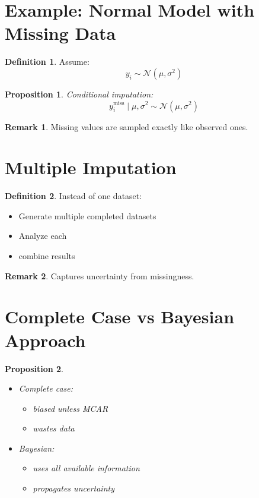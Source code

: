 \documentclass[12pt,oneside]{book}
\numberwithin{equation}{section}
\theoremstyle{definition}
\newtheorem{definition}{Definition}[section]
\newtheorem{remark}{Remark}[section]
\theoremstyle{plain}
\newtheorem{proposition}{Proposition}[section]
\theoremstyle{remark}
\newcommand{\Normal}{\mathcal{N}}
\begin{document}
\section{Example: Normal Model with Missing Data}

\begin{definition}
Assume:
$$
y_i \sim \Normal(\mu, \sigma^2)
$$
\end{definition}

\begin{proposition}
Conditional imputation:
$$
y_i^{\text{miss}} \mid \mu, \sigma^2 \sim \Normal(\mu, \sigma^2)
$$
\end{proposition}

\begin{remark}
Missing values are sampled exactly like observed ones.
\end{remark}

\section{Multiple Imputation}

\begin{definition}
Instead of one dataset:
\begin{itemize}
\item Generate multiple completed datasets
\item Analyze each
\item combine results
\end{itemize}
\end{definition}

\begin{remark}
Captures uncertainty from missingness.
\end{remark}

\section{Complete Case vs Bayesian Approach}

\begin{proposition}
\begin{itemize}
\item Complete case:
\begin{itemize}
\item biased unless MCAR
\item wastes data
\end{itemize}

\item Bayesian:
\begin{itemize}
\item uses all available information
\item propagates uncertainty
\end{itemize}
\end{itemize}
\end{proposition}
\end{document}
